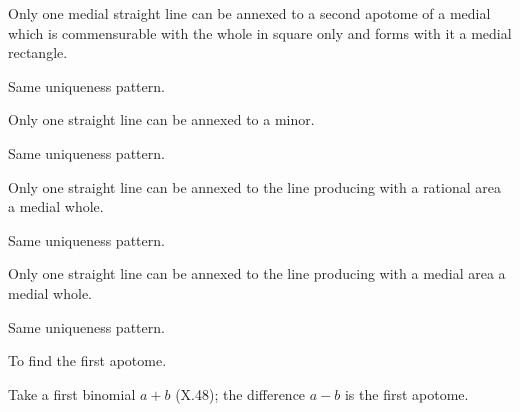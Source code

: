 \documentclass{rrxiv}
\begin{document}
\begin{claim}
\label{prop:X.81}
Only one medial straight line can be annexed to a second apotome of
a medial which is commensurable with the whole in square only and
forms with it a medial rectangle.
\end{claim}
\begin{evidence}[Proof of X.81]
\label{ev:X.81}
Same uniqueness pattern.
\end{evidence}

\begin{claim}
\label{prop:X.82}
Only one straight line can be annexed to a minor.
\end{claim}
\begin{evidence}[Proof of X.82]
\label{ev:X.82}
Same uniqueness pattern.
\end{evidence}

\begin{claim}
\label{prop:X.83}
Only one straight line can be annexed to the line producing with a
rational area a medial whole.
\end{claim}
\begin{evidence}[Proof of X.83]
\label{ev:X.83}
Same uniqueness pattern.
\end{evidence}

\begin{claim}
\label{prop:X.84}
Only one straight line can be annexed to the line producing with a
medial area a medial whole.
\end{claim}
\begin{evidence}[Proof of X.84]
\label{ev:X.84}
Same uniqueness pattern.
\end{evidence}

\begin{claim}
\label{prop:X.85}
To find the first apotome.
\end{claim}
\begin{evidence}[Proof of X.85]
\label{ev:X.85}
Take a first binomial $a + b$ (X.48); the difference $a - b$ is the
first apotome.
\end{evidence}
\end{document}

